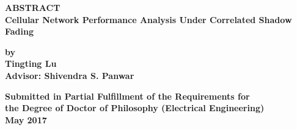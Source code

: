 \begin{center}
 {\large \bf ABSTRACT } \\ \vspace{0.2in}
 {\large \bf Cellular Network Performance Analysis Under Correlated Shadow Fading} \\ \vspace{0.2in}

 {\large \bf by } \\ \vspace{0.3in}
 {\large \bf Tingting Lu} \\ \vspace{0.3in}
 {\large \bf Advisor: Shivendra S. Panwar}  \\ \vspace{0.2in}

 {\bf Submitted in Partial Fulfillment of the Requirements for\\
 the Degree of Doctor of Philosophy (Electrical Engineering)
 } \\
 \vspace{0.2in}
 {\bf May 2017} \\
 \vspace{0.2in}

\end{center}

